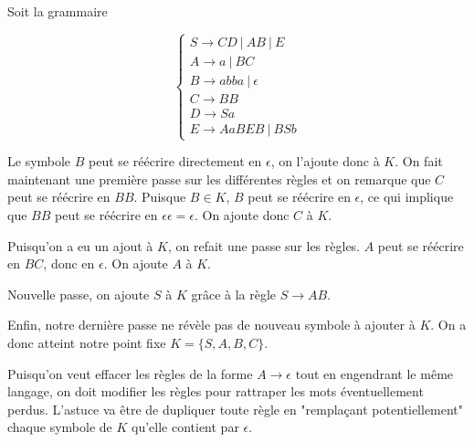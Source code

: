 \begin{example}
\label{gramelimeps1}
Soit la grammaire 

\[
\begin{cases}
S \rightarrow CD~|~AB~|~E \\
A \rightarrow a~|~BC \\
B \rightarrow abba~|~\epsilon \\
C \rightarrow BB \\
D \rightarrow Sa \\
E \rightarrow AaBEB~|~BSb
\end{cases}
\]

Le symbole $B$ peut se réécrire directement en $\epsilon$, on l'ajoute donc à $K$. On fait maintenant une première passe sur les différentes règles et on remarque que $C$ peut se réécrire en $BB$. Puisque $B \in K$, $B$ peut se réécrire en $\epsilon$, ce qui implique que $BB$ peut se réécrire en $\epsilon \epsilon = \epsilon$. On ajoute donc $C$ à $K$.

Puisqu'on a eu un ajout à $K$, on refait une passe sur les règles. $A$ peut se réécrire en $BC$, donc en $\epsilon$. On ajoute $A$ à $K$.

Nouvelle passe, on ajoute $S$ à $K$ grâce à la règle $S \rightarrow AB$. 

Enfin, notre dernière passe ne révèle pas de nouveau symbole à ajouter à $K$. On a donc atteint notre point fixe $K = \{S,A,B,C\}$.
\end{example}

Puisqu'on veut effacer les règles de la forme $A \rightarrow \epsilon$ tout en engendrant le même langage, on doit modifier les règles pour rattraper les mots éventuellement perdus. L'astuce va être de dupliquer toute règle  en "remplaçant potentiellement" chaque symbole de $K$ qu'elle contient par $\epsilon$.

